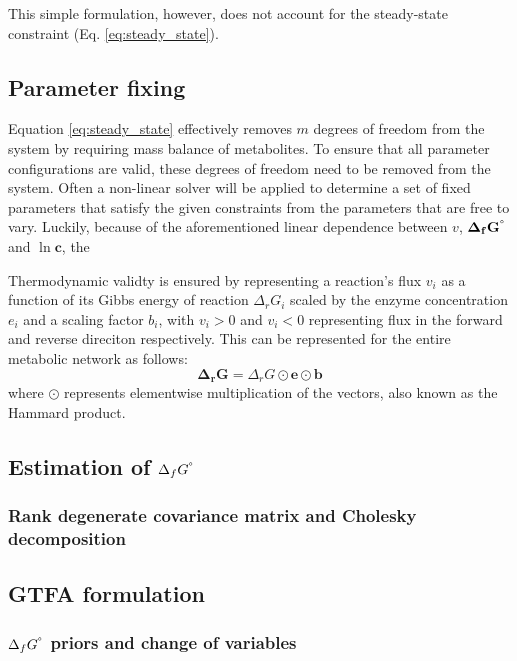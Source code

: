 \documentclass[10pt,letterpaper]{article}
\newcommand{\sdgf}{\Delta_fG^{\degree}}
\newcommand{\dgr}{\Delta_rG}
\newcommand{\bsdgf}{\mathbf{\sdgf}}
\newcommand{\bdgr}{\mathbf{\dgr}}
\newcommand{\bc}{\mathbf{c}}
\begin{document}
This simple formulation, however, does not account for the steady-state constraint (Eq. \ref{eq:steady_state}).

\subsection{Parameter fixing}
Equation \ref{eq:steady_state} effectively removes $m$ degrees of freedom from the system by requiring mass balance of metabolites.
To ensure that all parameter configurations are valid, these degrees of freedom need to be removed from the system.
Often a non-linear solver will be applied to determine a set of fixed parameters that satisfy the given constraints from the parameters that are free to vary. %
Luckily, because of the aforementioned linear dependence between $v$, $\bsdgf$ and $\ln{\bc}$, the






Thermodynamic validty is ensured by representing a reaction's flux $v_i$ as a function of its Gibbs energy of reaction $\dgr_i$ scaled by the enzyme concentration $e_i$ and a scaling factor $b_i$, with $v_i>0$ and $v_i<0$ representing flux in the forward and reverse direciton respectively.
This can be represented for the entire metabolic network as follows:
\[
    \bdgr = \dgr\odot\mathbf{e}\odot\mathbf{b}
\]
where $\odot$ represents elementwise multiplication of the vectors, also known as the Hammard product.

\subsection{Estimation of $\sdgf$} \label{sec:sdgf_estimation}
\subsubsection{Rank degenerate covariance matrix and Cholesky decomposition}

\subsection{GTFA formulation}

\subsubsection{$\sdgf$ priors and change of variables}
\end{document}
